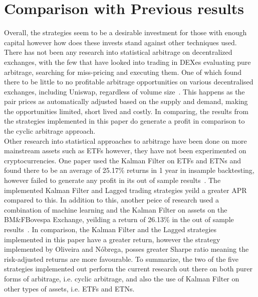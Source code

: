 \section{Comparison with Previous results}
Overall, the strategies seem to be a desirable investment for those with enough capital however how does these invests stand against other techniques used. There has not been any research into statistical arbitrage on decentralized exchanges, with the few that have looked into trading in DEXes evaluating pure arbitrage, searching for miss-pricing and executing them. One of which found there to be little to no profitable arbitrage opportunities on various decentralised exchanges, including Uniswap, regardless of volume size~\cite{boonpeam2021arbitrage}. This happens as the pair prices as automatically adjusted based on the supply and demand, making the opportunities limited, short lived and costly. In comparing, the results from the strategies implemented in this paper do generate a profit in comparison to the cyclic arbitrage approach.
\\[5mm]
Other research into statistical approaches to arbitrage have been done on more mainstream assets such as ETFs however, they have not been experimented on cryptocurrencies. One paper used the Kalman Filter on ETFs and ETNs and found there to be an average of 25.17\% returns in 1 year in insample backtesting, however failed to generate any profit in its out of sample results~\cite{dempsey_market_2017}. The implemented Kalman Filter and Lagged trading strategies yeild a greater APR compared to this. In addition to this, another peice of research used a combination of machine learning and the Kalman Filter on assets on the BM\&FBovespa Exchange, yeilding a return of 26.13\% in the out of sample results~\cite{6974093}. In comparison, the Kalman Filter and the Lagged strategies implemented in this paper have a greater return, however the strategy implemented by Oliveira and Nóbrega, posses greater Sharpe ratio meaning the risk-adjusted returns are more favourable. To summarize, the two of the five strategies implemented out perform the current research out there on both purer forms of arbitrage, i.e. cyclic arbitrage, and also the use of Kalman Filter on other types of assets, i.e. ETFs and ETNs.
